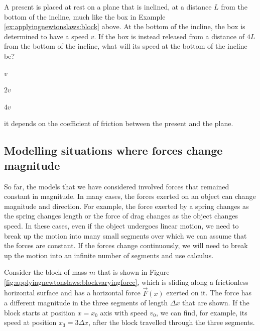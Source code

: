 \begin{checkpoint}
\begin{MCquestion}{A present is placed at rest on a plane that is inclined, at a distance $L$ from the bottom of the incline, much like the box in Example \ref{ex:applyingnewtonslaws:block} above. At the bottom of the incline, the box is determined to have a speed $v$. If the box is instead released from a distance of $4L$ from the bottom of the incline, what will its speed at the bottom of the incline be?}
\item $v$
\item $2v$\correct
\item $4v$
\item it depends on the coefficient of friction between the present and the plane.
\end{MCquestion}
\end{checkpoint}


\subsection{Modelling situations where forces change magnitude}
So far, the models that we have considered involved forces that remained constant in magnitude. In many cases, the forces exerted on an object can change magnitude and direction. For example, the force exerted by a spring changes as the spring changes length or the force of drag changes as the object changes speed. In these cases, even if the object undergoes linear motion, we need to break up the motion into many small segments over which we can assume that the forces are constant. If the forces change continuously, we will need to break up the motion into an infinite number of segments and use calculus.

Consider the block of mass $m$ that is shown in Figure \ref{fig:applyingnewtonslaws:blockvaryingforce}, which is sliding along a frictionless horizontal surface and has a  horizontal force $\vec F(x)$ exerted on it. The force has a different magnitude in the three segments of length $\Delta x$ that are shown. If the block starts at position $x=x_0$ axis with speed $v_0$, we can find, for example, its speed at position $x_3=3\Delta x$, after the block travelled through the three segments.


